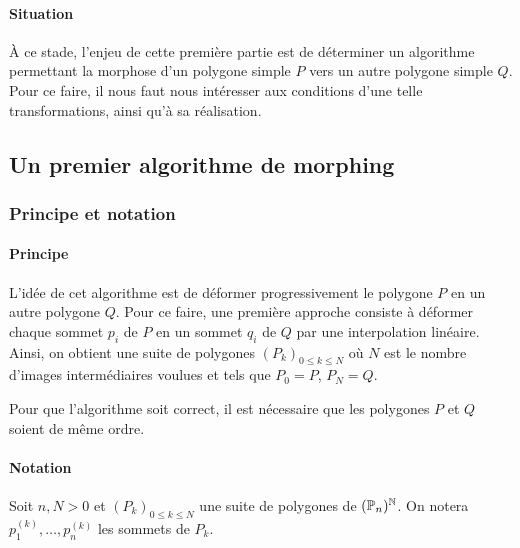 



\paragraph{Situation} À ce stade, l'enjeu de cette première partie est de déterminer un algorithme permettant 
la morphose d'un polygone simple $P$ vers un autre polygone simple $Q$. Pour ce faire, il nous faut nous intéresser
aux conditions d'une telle transformations, ainsi qu'à sa réalisation.

\subsection[Morphing naif]{Un premier algorithme de morphing}
\label{sec:morphing-naif}
\subsubsection{Principe et notation}
\paragraph{Principe} L'idée de cet algorithme est de déformer progressivement le polygone $P$ en un autre polygone $Q$.
Pour ce faire, une première approche consiste à déformer chaque sommet $p_i$ de $P$ en un sommet $q_i$ de $Q$ par
une interpolation linéaire. Ainsi, on obtient une suite de polygones $(P_{k})_{0\leq k\leq N}$ 
où $N$ est le nombre d'images intermédiaires voulues et tels que $P_{0}=P$, $P_{N}=Q$.

\begin{coder}
    Pour que l'algorithme soit correct, il est nécessaire que les polygones $P$ et $Q$ soient de même ordre.
\end{coder}

\paragraph*{Notation} Soit $n,N>0$ et $(P_k)_{0\leq k\leq N}$ une suite de polygones de $(\mathbb{P}_{n})^{\mathbb{N}}$.
 On notera $p^{(k)}_1,\ldots,p^{(k)}_n$ les sommets de $P_k$.

